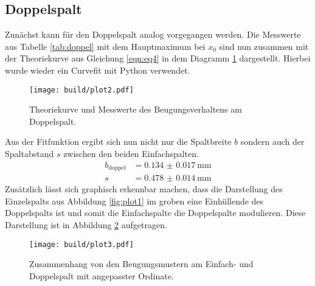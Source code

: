 \subsection{Doppelspalt}
Zunächst kann für den Doppelspalt analog vorgegangen werden. Die Messwerte aus Tabelle \ref{tab:doppel} mit dem Hauptmaximum bei $x_{0}$ sind nun zusammen mit der
Theoriekurve aus Gleichung \eqref{eqn:eq4} in dem Diagramm \ref{fig:plot2} dargestellt. Hierbei wurde wieder ein Curvefit mit Python verwendet.
\begin{figure}
    \centering
    \texttt{[image: build/plot2.pdf]}
    \caption{Theoriekurve und Messwerte des Beugungsverhaltens am Doppelspalt.} 
    \label{fig:plot2}
\end{figure}
Aus der Fitfunktion ergibt sich nun nicht nur die Spaltbreite $b$ sondern auch der Spaltabstand $s$ zwischen den beiden Einfachspalten. 
\begin{align}
b_{\text{doppel}} &= \SI{0.134(17)}{\milli\meter}\\
s &= \SI{0.478(14)}{\milli\meter}
\end{align}
Zusätzlich lässt sich graphisch erkennbar machen, dass die Darstellung des Einzelspalts aus Abbildung \ref{fig:plot1} im groben eine Einhüllende des Doppelspalts ist und somit die 
Einfachspalte die Doppelspalte modulieren. Diese Darstellung ist in Abbildung \ref{fig:plot3} aufgetragen.
\begin{figure}
    \centering
    \texttt{[image: build/plot3.pdf]}
    \caption{Zusammenhang von den Beugungsmustern am Einfach- und Doppelspalt mit angepasster Ordinate.} 
    \label{fig:plot3}
\end{figure}